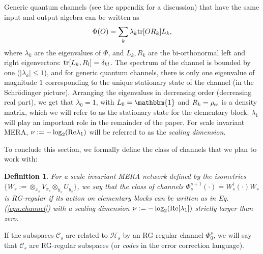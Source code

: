 \documentclass[a4paper,11pt]{article}
\newcommand{\1}{\mathbbm{1}}
\newcommand{\cH}{\mathcal{H}}
\newcommand{\cC}{\mathcal{C}}
\newcommand{\tr}{{\rm tr}}
\newtheorem{defi}{Definition}
\begin{document}
Generic quantum channels (see the appendix for a discussion) that have the same input and output algebra can be written as
\begin{equation}\label{eqn:channel}
\Phi(O)=\sum_k \lambda_k \tr[OR_k]L_k,
\end{equation}
where $\lambda_k$ are the eigenvalues of $\Phi$, and $L_k,R_k$ are the bi-orthonormal left and right eigenvectors: $\tr[L_k,R_l]=\delta_{kl}$. The spectrum of the channel is bounded by one ($|\lambda_k|\leq 1$), and for generic quantum channels, there is only one eigenvalue of magnitude $1$ corresponding to the unique stationary state of the channel (in the Schr\"odinger picture). Arranging the eigenvalues in decreasing order (decreasing real part), we get that $\lambda_0=1$, with  $L_0=\1$ and $R_k=\rho_{\rm ss}$ is a density matrix, which we will refer to as the stationary state for the elementary block. $\lambda_1$  will play an important role in the remainder of the paper. For scale invariant MERA, $\nu:=-\log_2({\rm Re}\lambda_1)$ will be referred to as the \textit{scaling dimension}.

To conclude this section, we formally define the class of channels that we plan to work with:
\begin{defi}
For a scale invariant MERA network defined by the isometries $\{W_s:= \otimes_{x_s} V_{x_s}\otimes_{y_s}U_{y_s}\}$, we say that the class of channels $\Phi_s^{s+1}(\cdot)=W^\dag_s(\cdot)W_s$  is {\rm RG-regular} if its action on elementary blocks can be written as in Eq. (\ref{eqn:channel}) with a scaling dimension $\nu:=-\log_2({\rm Re}[\lambda_1])$ strictly larger than zero.
\end{defi}

If the subspaces $\cC_s$ are related to $\cH_s$ by an RG-regular channel $\Phi_0^s$, we will say that $\cC_s$ are RG-regular subspaces (or \textit{codes} in the error correction language).

\end{document}
